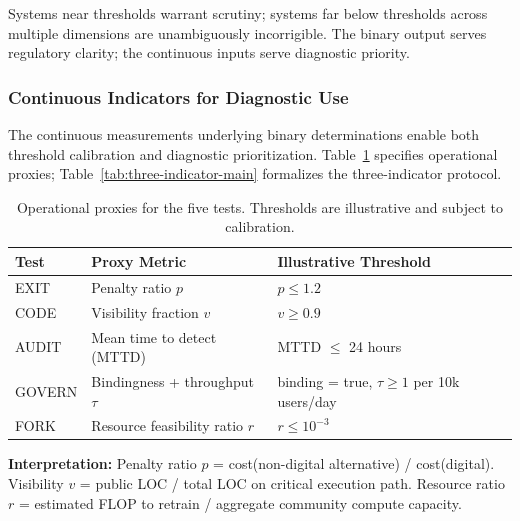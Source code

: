 \documentclass{article}
\begin{document}
Systems near thresholds warrant scrutiny; systems far below thresholds across multiple dimensions are unambiguously incorrigible. The binary output serves regulatory clarity; the continuous inputs serve diagnostic priority.

\subsubsection{Continuous Indicators for Diagnostic Use}

The continuous measurements underlying binary determinations enable both threshold calibration and diagnostic prioritization. Table~\ref{tab:operational-proxies-main} specifies operational proxies; Table~\ref{tab:three-indicator-main} formalizes the three-indicator protocol.

\begin{table}[htbp]
\centering
\caption{Operational proxies for the five tests. Thresholds are illustrative and subject to calibration.}
\label{tab:operational-proxies-main}
\begin{tabular}{lll}
\toprule
\textbf{Test} & \textbf{Proxy Metric} & \textbf{Illustrative Threshold} \\
\midrule
EXIT & Penalty ratio $p$ & $p \leq 1.2$ \\
CODE & Visibility fraction $v$ & $v \geq 0.9$ \\
AUDIT & Mean time to detect (MTTD) & MTTD $\leq$ 24 hours \\
GOVERN & Bindingness + throughput $\tau$ & binding = true, $\tau \geq 1$ per 10k users/day \\
FORK & Resource feasibility ratio $r$ & $r \leq 10^{-3}$ \\
\bottomrule
\end{tabular}
\end{table}

\textbf{Interpretation:} Penalty ratio $p$ = cost(non-digital alternative) / cost(digital). Visibility $v$ = public LOC / total LOC on critical execution path. Resource ratio $r$ = estimated FLOP to retrain / aggregate community compute capacity.
\end{document}

